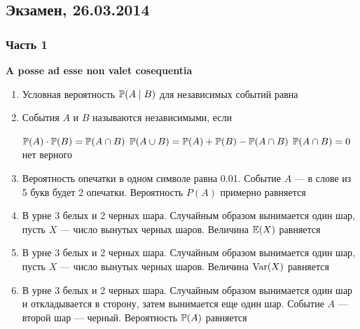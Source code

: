 \documentclass[12pt, a4paper]{article}\usepackage[]{graphicx}\usepackage[]{color}
\begin{document}
				\subsection{Экзамен, 26.03.2014}

				\subsubsection*{Часть 1}

				\textbf{A posse ad esse non valet cosequentia}

				\begin{enumerate}

					\item Условная вероятность $\P(A\mid B)$ для независимых событий равна


					\item События $A$ и $B$ называются независимыми, если

					{$\P(A)\cdot\P(B)=\P(A\cap B)$}
					{$\P(A\cup B)=\P(A)+\P(B)-\P(A\cap B)$}
					{$\P(A\cap B)=0$}
					{нет верного} \\

					\item Вероятность опечатки в одном символе равна 0.01. Событие $A$ — в слове из 5 букв будет 2 опечатки. Вероятность $P(A)$ примерно равняется


					\item В урне 3 белых и 2 черных шара. Случайным образом вынимается один шар, пусть $X$ — число вынутых черных шаров. Величина $\E(X)$ равняется


					\item В урне 3 белых и 2 черных шара. Случайным образом вынимается один шар, пусть $X$ — число вынутых черных шаров. Величина $\Var(X)$ равняется


					\item В урне 3 белых и 2 черных шара. Случайным образом вынимается один шар и откладывается в сторону, затем вынимается еще один шар. Событие $A$ — второй шар — черный. Вероятность $\P(A)$ равняется


\end{enumerate}
\end{document}
